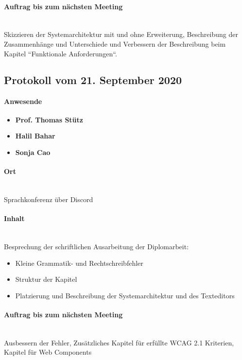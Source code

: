 \paragraph{Auftrag bis zum nächsten Meeting}\mbox{}\\
Skizzieren der Systemarchitektur mit und ohne Erweiterung, Beschreibung der Zusammenhänge und Unterschiede und Verbessern der Beschreibung beim Kapitel ``Funktionale Anforderungen``.

\subsection{Protokoll vom 21. September 2020}

\paragraph{Anwesende}
\begin{itemize}
	\item{\textbf{Prof. Thomas Stütz}}
	\item{\textbf{Halil Bahar}}
	\item{\textbf{Sonja Cao}}
\end{itemize}

\paragraph{Ort}\mbox{}\\
Sprachkonferenz über Discord

\paragraph{Inhalt}\mbox{}\\
Besprechung der schriftlichen Ausarbeitung der Diplomarbeit:
\begin{itemize}
	\item{Kleine Grammatik- und Rechtschreibfehler}
	\item{Struktur der Kapitel}
	\item{Platzierung und Beschreibung der Systemarchitektur und des Texteditors}
\end{itemize}

\paragraph{Auftrag bis zum nächsten Meeting}\mbox{}\\
Ausbessern der Fehler, Zusätzliches Kapitel für erfüllte WCAG 2.1 Kriterien, Kapitel für Web Components


